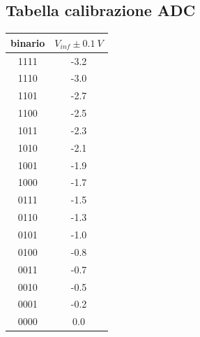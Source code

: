 \documentclass[journal]{IEEEtran}
\begin{document}
\begin{appendices}
\section{Tabella calibrazione ADC}

\begin{tabular}{cc}
binario & $V_{inf}  \pm 0.1 \ V$ \\ \hline
1111    & -3.2                  \\
1110    & -3.0                  \\
1101    & -2.7                  \\
1100    & -2.5                  \\
1011    & -2.3                  \\
1010    & -2.1                  \\
1001    & -1.9                  \\
1000    & -1.7                  \\
0111    & -1.5                  \\
0110    & -1.3                  \\
0101    & -1.0                  \\
0100    & -0.8                  \\
0011    & -0.7                  \\
0010    & -0.5                  \\
0001    & -0.2                  \\
0000    & 0.0
\vspace{5 mm}
\label{tab:calibrazione_adc}
\end{tabular}


\end{appendices}


\clearpage
\newpage

\tableofcontents %

\newpage

\printbibliography %
\end{document}
